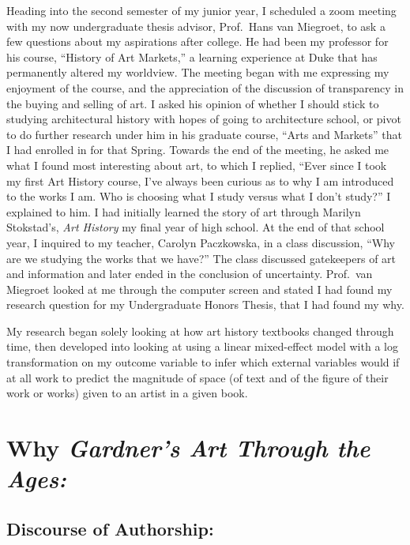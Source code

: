 \documentclass[
  letterpaper,
  DIV=11,
  numbers=noendperiod]{scrreprt}
\begin{document}
Heading into the second semester of my junior year, I scheduled a zoom
meeting with my now undergraduate thesis advisor, Prof.~Hans van
Miegroet, to ask a few questions about my aspirations after college. He
had been my professor for his course, ``History of Art Markets,'' a
learning experience at Duke that has permanently altered my worldview.
The meeting began with me expressing my enjoyment of the course, and the
appreciation of the discussion of transparency in the buying and selling
of art. I asked his opinion of whether I should stick to studying
architectural history with hopes of going to architecture school, or
pivot to do further research under him in his graduate course, ``Arts
and Markets'' that I had enrolled in for that Spring. Towards the end of
the meeting, he asked me what I found most interesting about art, to
which I replied, ``Ever since I took my first Art History course, I've
always been curious as to why I am introduced to the works I am. Who is
choosing what I study versus what I don't study?'' I explained to him. I
had initially learned the story of art through Marilyn Stokstad's,
\emph{Art History} my final year of high school. At the end of that
school year, I inquired to my teacher, Carolyn Paczkowska, in a class
discussion, ``Why are we studying the works that we have?'' The class
discussed gatekeepers of art and information and later ended in the
conclusion of uncertainty. Prof.~van Miegroet looked at me through the
computer screen and stated I had found my research question for my
Undergraduate Honors Thesis, that I had found my why.

My research began solely looking at how art history textbooks changed
through time, then developed into looking at using a linear mixed-effect
model with a log transformation on my outcome variable to infer which
external variables would if at all work to predict the magnitude of
space (of text and of the figure of their work or works) given to an
artist in a given book.

\hypertarget{why-gardners-art-through-the-ages}{%
\section{\texorpdfstring{Why \emph{Gardner's Art Through the
Ages:}}{Why Gardner's Art Through the Ages:}}\label{why-gardners-art-through-the-ages}}

\hypertarget{discourse-of-authorship}{%
\subsection{Discourse of Authorship:}\label{discourse-of-authorship}}
\end{document}
